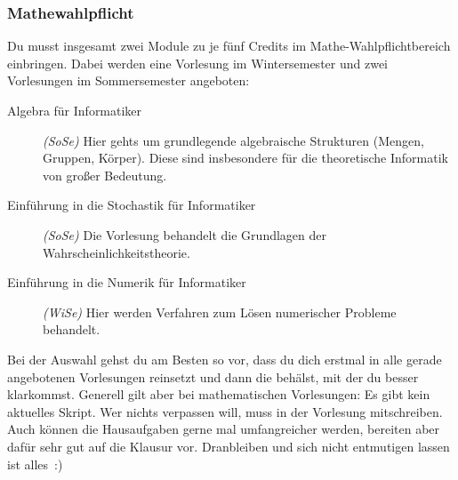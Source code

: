 
\subsubsection{Mathewahlpflicht}
Du musst insgesamt zwei Module zu je fünf Credits
	im Mathe-Wahlpflichtbereich einbringen. Dabei werden eine Vorlesung im Wintersemester und zwei
	Vorlesungen im Sommersemester angeboten:

	
	\begin{description} 
		\item[Algebra für Informatiker] \emph{(SoSe)} Hier gehts um grundlegende
		algebraische Strukturen (Mengen, Gruppen, Körper). Diese sind insbesondere für die
		theoretische Informatik von großer Bedeutung.
		\item[Einführung in die Stochastik für Informatiker] \emph{(SoSe)} Die
		Vorlesung behandelt die Grundlagen der
		Wahrscheinlichkeitstheorie. 
		\item[Einführung in die Numerik für Informatiker] \emph{(WiSe)} Hier werden Verfahren zum Lösen numerischer Probleme behandelt. 
	\end{description}

	Bei der Auswahl gehst du am Besten so vor, dass du dich erstmal
	in alle gerade angebotenen Vorlesungen reinsetzt und dann die behälst, mit der du besser
	klarkommst. Generell gilt aber bei mathematischen Vorlesungen: Es
	gibt kein aktuelles Skript. Wer nichts verpassen
	will, muss in der Vorlesung mitschreiben. Auch können die
	Hausaufgaben gerne mal umfangreicher werden, bereiten aber dafür
	sehr gut auf die Klausur vor. Dranbleiben und sich nicht
	entmutigen lassen ist alles~:)